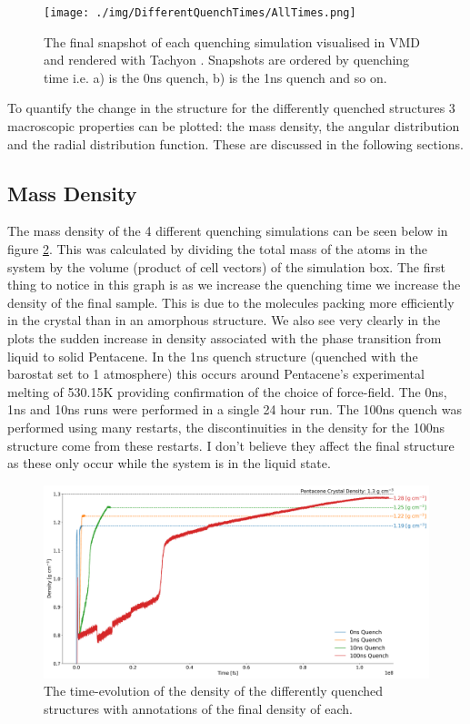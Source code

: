 \begin{figure}[h]
	\texttt{[image: ./img/DifferentQuenchTimes/AllTimes.png]}
	\caption{\label{fig:final_snapshots}The final snapshot of each quenching simulation visualised in VMD \cite{VMD} and rendered with Tachyon \cite{Tachyon}. Snapshots are ordered by quenching time i.e. a) is the 0ns quench, b) is the 1ns quench and so on.}
\end{figure}
\noindent To quantify the change in the structure for the differently quenched structures 3 macroscopic properties can be plotted: the mass density, the angular distribution and the radial distribution function. These are discussed in the following sections.
\subsection{Mass Density}
The mass density of the 4 different quenching simulations can be seen below in figure \ref{fig:QuenchDensity}. This was calculated by dividing the total mass of the atoms in the system by the volume (product of cell vectors) of the simulation box. The first thing to notice in this graph is as we increase the quenching time we increase the density of the final sample. This is due to the molecules packing more efficiently in the crystal than in an amorphous structure. We also see very clearly in the plots the sudden increase in density associated with the phase transition from liquid to solid Pentacene. In the 1ns quench structure (quenched with the barostat set to 1 atmosphere) this occurs around Pentacene's experimental melting of 530.15K \cite{PentaceneMeltingPoint} providing confirmation of the choice of force-field. The 0ns, 1ns and 10ns runs were performed in a single 24 hour run. The 100ns quench was performed using many restarts, the discontinuities in the density for the 100ns structure come from these restarts. I don't believe they affect the final structure as these only occur while the system is in the liquid state.
\begin{figure}[H]
	\includegraphics[width=\textwidth]{./img/DifferentQuenchTimes/Density.png}
	\caption{\label{fig:QuenchDensity}The time-evolution of the density of the differently quenched structures with annotations of the final density of each.}
\end{figure}

